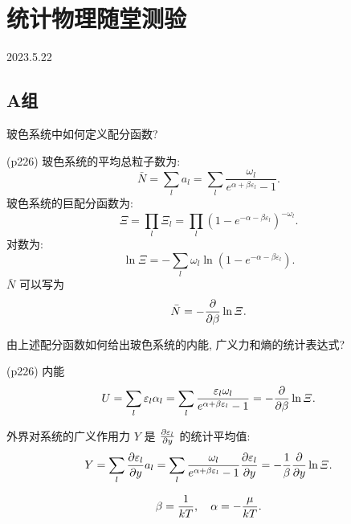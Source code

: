 \section{统计物理随堂测验}
2023.5.22
\subsection{A组}
\begin{questions}
  \qt 玻色系统中如何定义配分函数?
  \begin{solution}
    (p226) 玻色系统的平均总粒子数为:
    \begin{equation}
      \bar{N} = \sum_l a_l = \sum_l \frac{\omega_l}{e^{\alpha+\beta\varepsilon_l}-1}.
    \end{equation}
    玻色系统的巨配分函数为:
    \begin{equation}
      \varXi = \prod_l \varXi_l = \prod_l (1-e^{-\alpha-\beta\varepsilon_l})^{-\omega_l}.
    \end{equation}
    对数为:
    \begin{equation}
      \ln\varXi = -\sum_l \omega_l \ln(1-e^{-\alpha-\beta\varepsilon_l}).
    \end{equation}
    $\bar{N}$ 可以写为
    \begin{equation}
      \bar{N} = -\pdv{\beta} \ln\varXi.
    \end{equation}
  \end{solution}
  \qt 由上述配分函数如何给出玻色系统的内能, 广义力和熵的统计表达式?
  \begin{solution}
    (p226) 内能
    \begin{equation}
      U = \sum_l \varepsilon_l \alpha_l = \sum_l \frac{\varepsilon_l \omega_l}{e^{\alpha+\beta\varepsilon_l}-1} = -\pdv{\beta} \ln \varXi.
    \end{equation}

    外界对系统的广义作用力 $Y$ 是 $\pdv{\varepsilon_l}{y}$ 的统计平均值:
    \begin{equation}
      Y = \sum_l \pdv{\varepsilon_l}{y}a_l = \sum_l \frac{\omega_l}{e^{\alpha+\beta\varepsilon_l}-1} \pdv{\varepsilon_l}{y} = -\frac{1}{\beta}\pdv{y}\ln\varXi.
    \end{equation}

    \begin{equation}
      \beta = \frac{1}{kT} \qc \alpha = -\frac{\mu}{kT}.
    \end{equation}


\end{solution}
\end{questions}
